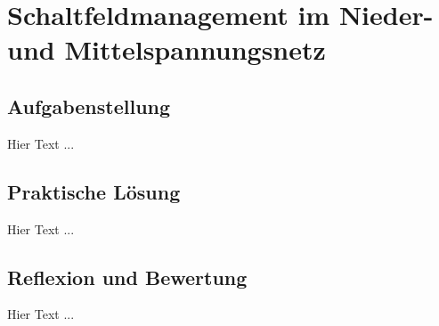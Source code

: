 \chapter{Schaltfeldmanagement im Nieder- und Mittelspannungsnetz}
\label{cha:Schaltfeldmanagement}

\section{Aufgabenstellung}

Hier Text ... 

\section{Praktische Lösung}

Hier Text ... 

\section{Reflexion und Bewertung}

Hier Text ... 

\clearpage
